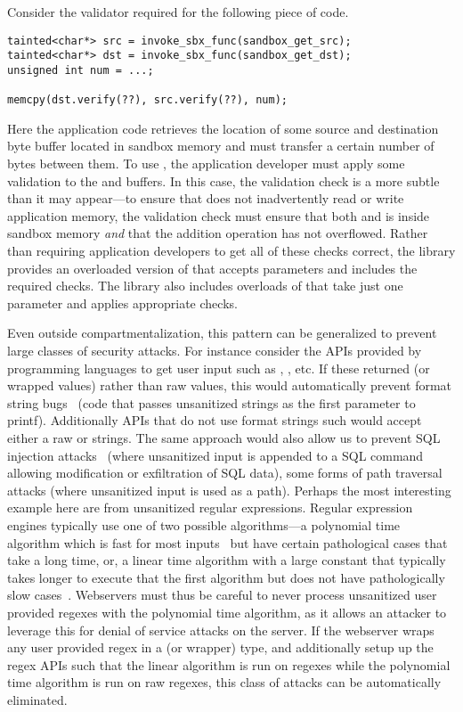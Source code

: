 %
Consider the validator required for the following piece of code.
%
\begin{verbatim}
tainted<char*> src = invoke_sbx_func(sandbox_get_src);
tainted<char*> dst = invoke_sbx_func(sandbox_get_dst);
unsigned int num = ...;

memcpy(dst.verify(??), src.verify(??), num);
\end{verbatim}
%
Here the application code retrieves the location of some source and destination 
byte buffer located in sandbox memory and must transfer a certain number of 
bytes between them.
%
To use , the application developer must apply some validation to 
the  and  buffers.
%
In this case, the validation check is a more subtle than it may appear---to 
ensure that  does not inadvertently read or write application 
memory, the validation check must ensure that both  and 
 is inside sandbox memory \emph{and} that the addition 
operation has not overflowed.
%
Rather than requiring application developers to get all of these checks 
correct, the \sys library provides an overloaded version of  that 
accepts \tainted parameters and includes the required checks.
%
The \sys library also includes overloads of  that take just one 
\tainted parameter and applies appropriate checks.

Even outside compartmentalization, this pattern can be generalized to prevent 
large classes of security attacks.
%
For instance consider the APIs provided by programming languages to get user 
input such as , ,  etc.
%
If these returned \tainted (or wrapped values) rather than raw values, this 
would automatically prevent  format string bugs~\tocite{} (code 
that passes unsanitized strings as the first parameter to printf).
%
Additionally APIs that do not use format strings such  would accept 
either a raw or \tainted strings.
%
The same approach would also allow us to prevent SQL injection 
attacks~\tocite{} (where 
unsanitized input is appended to a SQL command allowing modification or 
exfiltration of SQL data), some forms of path traversal attacks (where 
unsanitized input is used as a path).
%
Perhaps the most interesting example here are from unsanitized regular 
expressions.
%
Regular expression engines typically use one of two possible algorithms---a 
polynomial time algorithm which is fast for most inputs~\tocite{} but have 
certain pathological cases that take a long time, or, a linear time algorithm 
with a large constant that typically takes longer to execute that the first 
algorithm but does not have pathologically slow cases~\tocite{}.
%
Webservers must thus be careful to never process unsanitized user provided 
regexes with the polynomial time algorithm, as it allows an attacker to 
leverage this for denial of service attacks on the server.
%
If the webserver wraps any user provided regex in a \tainted (or wrapper) type, 
and additionally setup up the regex APIs such that the linear algorithm is run 
on \tainted regexes while the polynomial time algorithm is run on raw regexes, 
this class of attacks can be automatically eliminated.